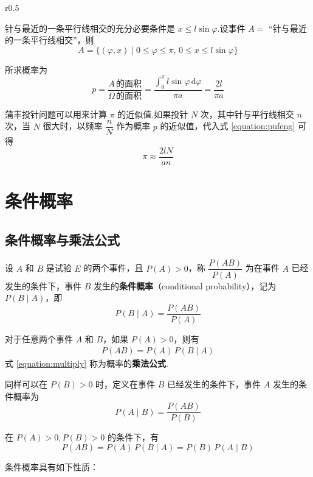 \begin{solution}
\begin{wrapfigure}[6]{r}{0.5\textwidth}
        \caption{}
        \label{fig:pufeng:2}
    \end{wrapfigure}

    针与最近的一条平行线相交的充分必要条件是 $x \leqslant l \sin \varphi$.设事件 $A=$ “针与最近的一条平行线相交”，则
    $$
    A = \{(\varphi,x) \mid 0 \leqslant \varphi \leqslant \pi, \, 0 \leqslant x \leqslant l \sin \varphi\}
    $$

    所求概率为
    \begin{equation} \label{equation:pufeng}
        p = \dfrac{A\, \text{的面积}}{\varOmega \, \text{的面积}} = \dfrac{\displaystyle\int_0^{\pi} l \sin\varphi \, \text{d} \varphi}{\pi a} = \dfrac{2l}{\pi a}
    \end{equation}
\end{solution}

蒲丰投针问题可以用来计算 $\pi$ 的近似值.如果投针 $N$ 次，其中针与平行线相交 $n$ 次，当 $N$ 很大时，以频率 $\dfrac{n}{N}$ 作为概率 $p$ 的近似值，代入式 \eqref{equation:pufeng} 可得
$$
\pi \approx \dfrac{2lN}{an}
$$

\section{条件概率}

\subsection{条件概率与乘法公式}

\begin{definition}
    设 $A$ 和 $B$ 是试验 $E$ 的两个事件，且 $P(A)>0$，称 $\dfrac{P(AB)}{P(A)}$ 为在事件 $A$ 已经发生的条件下，事件 $B$ 发生的\textbf{条件概率}（conditional probability），记为 $P(B \mid A)$，即
    $$
    P(B \mid A)=\dfrac{P(AB)}{P(A)}
    $$
\end{definition}

对于任意两个事件 $A$ 和 $B$，如果 $P(A)>0$，则有
\begin{align} \label{equation:multiply}
    P(AB)=P(A) \, P(B \mid A)
\end{align}
式 \eqref{equation:multiply} 称为概率的\textbf{乘法公式}.

同样可以在 $P(B)>0$ 时，定义在事件 $B$ 已经发生的条件下，事件 $A$ 发生的条件概率为
$$
P(A \mid B)=\dfrac{P(AB)}{P(B)}
$$

在 $P(A)>0,P(B)>0$ 的条件下，有
$$
P(AB) = P(A) \, P(B \mid A) = P(B) \, P(A \mid B)
$$

条件概率具有如下性质：

